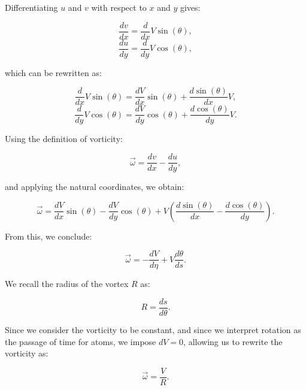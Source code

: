 Differentiating $u$ and $v$ with respect to $x$ and $y$ gives:


\begin{equation*}
\frac{d v}{d x}=\frac{d}{d x} V \sin (\theta),
\end{equation*}
\begin{equation*}
\frac{d u}{d y}=\frac{d}{d y} V \cos (\theta),
\end{equation*}


which can be rewritten as:


\begin{equation*}
\frac{d}{d x} V \sin (\theta) = \frac{d V}{d x} \sin (\theta) + \frac{d \sin (\theta)}{d x} V,
\end{equation*}
\begin{equation*}
\frac{d}{d y} V \cos (\theta) = \frac{d V}{d y} \cos (\theta) + \frac{d \cos (\theta)}{d y} V.
\end{equation*}


Using the definition of vorticity:


\begin{equation*}
\vec{\omega} = \frac{d v}{d x} - \frac{d u}{d y},
\end{equation*}


and applying the natural coordinates, we obtain:


\begin{equation*}
\vec{\omega} = \frac{d V}{d x} \sin (\theta) - \frac{d V}{d y} \cos (\theta) + V\left(\frac{d \sin (\theta)}{d x} - \frac{d \cos (\theta)}{d y}\right).
\end{equation*}


From this, we conclude:


\begin{equation*}
\vec{\omega} = -\frac{d V}{d \eta} + V \frac{d \theta}{d s}.
\end{equation*}


We recall the radius of the vortex $R$ as:


\begin{equation*}
R = \frac{d s}{d \theta}.
\end{equation*}


Since we consider the vorticity to be constant, and since we interpret rotation as the passage of time for atoms, we impose $dV=0$, allowing us to rewrite the vorticity as:


\begin{equation*}
\vec{\omega} = \frac{V}{R}.
\end{equation*}

